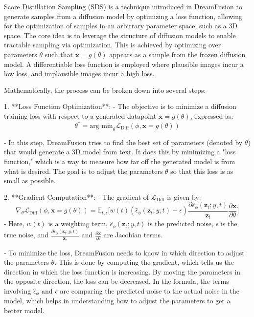 Score Distillation Sampling (SDS) is a technique introduced in DreamFusion to generate samples from a diffusion model by optimizing a loss function, allowing for the optimization of samples in an arbitrary parameter space, such as a 3D space. The core idea is to leverage the structure of diffusion models to enable tractable sampling via optimization. This is achieved by optimizing over parameters \( \theta \) such that \( \mathbf{x} = g(\theta) \) appears as a sample from the frozen diffusion model. A differentiable loss function is employed where plausible images incur a low loss, and implausible images incur a high loss.

Mathematically, the process can be broken down into several steps:

1. **Loss Function Optimization**:
    - The objective is to minimize a diffusion training loss with respect to a generated datapoint \( \mathbf{x} = g(\theta) \), expressed as:
     \[ \theta^{*} = \text{arg min}_{\theta} \mathcal{L}_{\text{Diff}}(\phi, \mathbf{x} = g(\theta)) \]
   
    - In this step, DreamFusion tries to find the best set of parameters (denoted by \( \theta \)) that would generate a 3D model from text. It does this by minimizing a "loss function," which is a way to measure how far off the generated model is from what is desired. The goal is to adjust the parameters \( \theta \) so that this loss is as small as possible.

2. **Gradient Computation**:
   - The gradient of \( \mathcal{L}_{\text{Diff}} \) is given by:
     \[ \nabla_{\theta}\mathcal{L}_{\text{Diff}}(\phi,\mathbf{x}=g(\theta))=\mathbb{E}_{t,\epsilon}\Bigg[w(t)\left(\hat{\epsilon}_{\phi}({\mathbf{z}}_{t};y,t)-\epsilon\right)\frac{\partial\hat{\epsilon}_{\phi}({\mathbf{z}}_{t};y,t)}{\mathbf{z}_t}\frac{\partial\mathbf{x}}{\partial\theta}\Bigg] \]
   - Here, \( w(t) \) is a weighting term, \( \hat{\epsilon}_{\phi}({\mathbf{z}}_{t};y,t) \) is the predicted noise, \( \epsilon \) is the true noise, and \( \frac{\partial\hat{\epsilon}_{\phi}({\mathbf{z}}_{t};y,t)}{\mathbf{z}_t} \) and \( \frac{\partial\mathbf{x}}{\partial\theta} \) are Jacobian terms. 

   - To minimize the loss, DreamFusion needs to know in which direction to adjust the parameters \( \theta \). This is done by computing the gradient, which tells us the direction in which the loss function is increasing. By moving the parameters in the opposite direction, the loss can be decreased. In the formula, the terms involving \( \hat{\epsilon}_{\phi} \) and \( \epsilon \) are comparing the predicted noise to the actual noise in the model, which helps in understanding how to adjust the parameters to get a better model.

